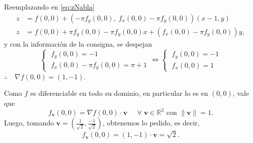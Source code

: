 \begin{solution}
    Reemplazando en \eqref{eq:zNabla}
    \begin{align*}
        z & = f(0,0)+\left(-\pi f_y(0,0),\;f_x(0,0)-\pi f_y(0,0)\right) (x-1,y)  \\
        z & =f(0,0)   +\pi f_y(0,0)   -  \pi f_y(0,0)x+(f_x(0,0)-\pi f_y(0,0))y,
    \end{align*}
    y con la información de la consigna, se despejan
    \[\begin{cases}
            \;f_y(0,0)=-1 \\[5pt]
            \;f_x(0,0)-\pi f_y(0,0)=\pi+1
        \end{cases}
        \iff
        \begin{cases}
            \;f_y(0,0)=-1 \\[5pt]
            \;f_x(0,0)=1
        \end{cases}
    \]
    $\therefore\quad\nabla f(0,0)=(1,-1)$.

    Como $f$ es diferenciable en todo su dominio, en particular lo es en $(0,0)$, vale que  $$f_{\mathbf{v}}(0,0)=\nabla f(0,0)\cdot{\mathbf{v}}\;\;\;\;\;  \forall \; {\mathbf{v}} \in \mathbb{R}^{2}  \mbox{ con } \|{\mathbf{v}}\|=1. $$ Luego,  tomando  $ {\mathbf{v}} = (\frac{1}{\sqrt{2}},\frac{-1}{\sqrt{2}})$, obtenemos lo pedido, es decir,
    \[
        f_{{\mathbf{v}}} (0,0)=(1,-1)\cdot {\mathbf{v}}= \sqrt{2}.
    \]
\end{solution}

